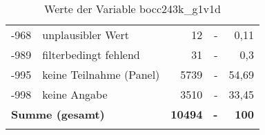 \begin{longtable}{Xlrrr}
       -968 & unplausibler Wert & 12 & - & 0,11 \\

       -989 & filterbedingt fehlend & 31 & - & 0,3 \\

       -995 & keine Teilnahme (Panel) & 5739 & - & 54,69 \\

       -998 & keine Angabe & 3510 & - & 33,45 \\

     \midrule
     \multicolumn{2}{l}{\textbf{Summe (gesamt)}} & \textbf{10494} & \textbf{-} & \textbf{100} \\
     \bottomrule
     \caption{Werte der Variable bocc243k\_g1v1d}
     \end{longtable}
     
